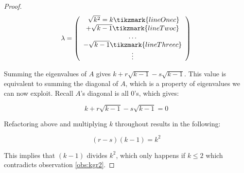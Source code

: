 \documentclass{article}
\begin{document}
\begin{proof}
\[ \lambda = 
    \left (
        \begin{array}{c}
            \
            \sqrt{k^2} = k \tikzmark{lineOnec} \\
            + \sqrt{k - 1} \tikzmark{lineTwoc}\\
            \dots \\
            - \sqrt{k - 1} \tikzmark{lineThreec}\\
            \vdots \\
        \end{array}
    \right )
\]


Summing the eigenvalues of $A$ gives $k + r\sqrt{k - 1} - s\sqrt{k -1}$. This value is equivalent to summing the diagonal of $A$, which is a property of eigenvalues we can now exploit. Recall $A$'s diagonal is all 0's, which gives:

\[ 
k + r\sqrt{k - 1} - s\sqrt{k -1} = 0
\]

Refactoring above and multiplying $k$ throughout results in the following:

\[
(r - s)(k - 1) = k^2
\]

This implies that $(k - 1)$ divides $k^2$, which only happens if $k \leq 2$ which contradicts observation \ref{obs:kgr2}.

\end{proof}
\end{document}
